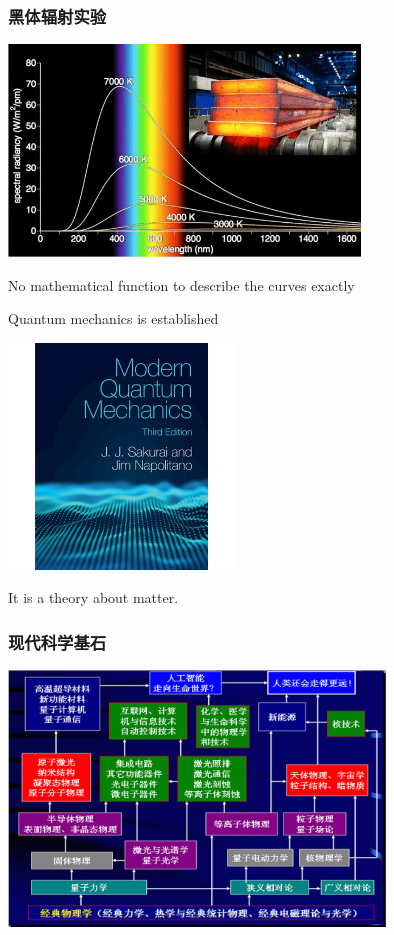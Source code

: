 \begin{frame}
    \frametitle{黑体辐射实验}
    \begin{center}
    \includegraphics[width=0.7\textwidth]{figs/2021-12-01-23-47-27.png}
    \end{center}
    No mathematical function to describe the curves exactly 
\end{frame}
\begin{frame}
    Quantum mechanics is established  
    \begin{center}
        \includegraphics[width=0.45\textwidth]{figs/mqm.jpg}
    \end{center}   
    It is a theory about matter.
\end{frame}

\begin{frame}
    \frametitle{现代科学基石}
    \begin{center}
        \includegraphics[width=0.75\textwidth]{figs/stone.png}
    \end{center}   
\end{frame}


